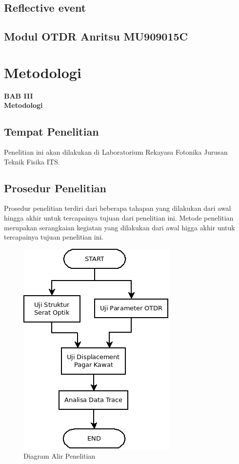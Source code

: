 \documentclass[12pt]{article}
\begin{document}
	\subsection{Reflective event}

	\subsection{Modul OTDR Anritsu MU909015C}
	



\newpage

	\setcounter{figure}{0}

	\section{Metodologi}
	
	\begin{center}
		{\large \textbf{BAB III}} \\
		{\large \textbf{Metodologi}}
	\end{center}
	
	\subsection{Tempat  Penelitian}
	
	Penelitian ini akan dilakukan di Laboratorium Rekayasa Fotonika Jurusan Teknik Fisika ITS.
	
	\subsection{Prosedur Penelitian}
	
	Prosedur penelitian terdiri dari beberapa tahapan yang dilakukan dari awal hingga akhir untuk tercapainya tujuan dari penelitian ini.
	Metode penelitian merupakan serangkaian kegiatan yang dilakukan dari awal higga akhir untuk tercapainya tujuan penelitian ini.
	
	\begin{figure}[!ht]
		\centering
		\captionsetup{justification=centering}
		\includegraphics[width=0.4\linewidth]{images/Bab_3/Bab_3_1}
		\caption[Diagram Alir Penelitian]{\small{Diagram Alir Penelitian}}
	\end{figure}
\end{document}
